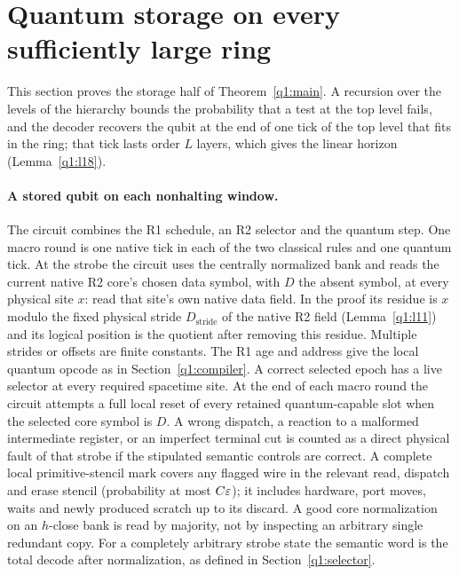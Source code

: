 \section{Quantum storage on every sufficiently large ring}\label{q1:storage}
This section proves the storage half of Theorem~\ref{q1:main}. A recursion over the levels of the hierarchy bounds the probability that a test at the top level fails, and the decoder recovers the qubit at the end of one tick of the top level that fits in the ring; that tick lasts order \(L\) layers, which gives the linear horizon (Lemma~\ref{q1:l18}).

\paragraph{A stored qubit on each nonhalting window.}

The circuit combines the R1 schedule, an R2 selector and the quantum step. One macro round is one native tick in each of the two classical rules and one quantum tick. At the strobe the circuit uses the centrally normalized bank and reads the current native R2 core's chosen data symbol, with \(D\) the absent symbol, at every physical site \(x\): read that site's own native data field. In the proof its residue is \(x\) modulo the fixed physical stride \(D_{\mathrm{stride}}\) of the native R2 field (Lemma~\ref{q1:l11}) and its logical position is the quotient after removing this residue. Multiple strides or offsets are finite constants. The R1 age and address give the local quantum opcode as in Section~\ref{q1:compiler}. A correct selected epoch has a live selector at every required spacetime site. At the end of each macro round the circuit attempts a full local reset of every retained quantum-capable slot when the selected core symbol is \(D\). A wrong dispatch, a reaction to a malformed intermediate register, or an imperfect terminal cut is counted as a direct physical fault of that strobe if the stipulated semantic controls are correct. A complete local primitive-stencil mark covers any flagged wire in the relevant read, dispatch and erase stencil (probability at most \(C\varepsilon\)); it includes hardware, port moves, waits and newly produced scratch up to its discard. A good core normalization on an \(h\)-close bank is read by majority, not by inspecting an arbitrary single redundant copy. For a completely arbitrary strobe state the semantic word is the total decode after normalization, as defined in Section~\ref{q1:selector}.

